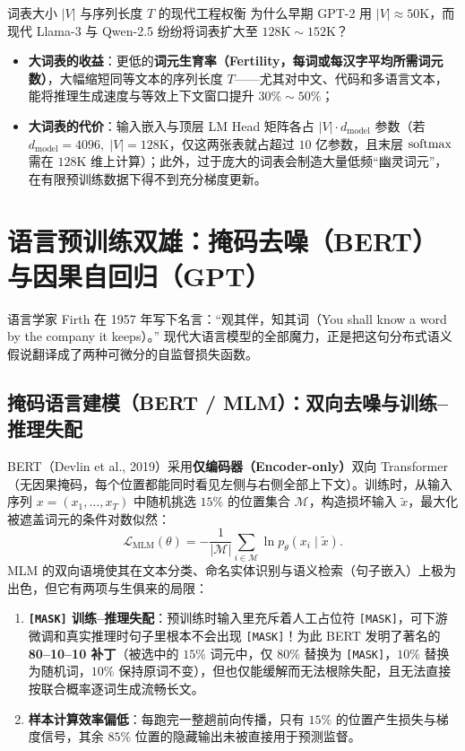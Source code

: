 \begin{insightBox}{词表大小 $|V|$ 与序列长度 $T$ 的现代工程权衡}
为什么早期 GPT-2 用 $|V| \approx 50\text{K}$，而现代 Llama-3 与 Qwen-2.5 纷纷将词表扩大至 $128\text{K} \sim 152\text{K}$？
\begin{itemize}
  \item \textbf{大词表的收益}：更低的\textbf{词元生育率（Fertility，每词或每汉字平均所需词元数）}，大幅缩短同等文本的序列长度 $T$——尤其对中文、代码和多语言文本，能将推理生成速度与等效上下文窗口提升 $30\% \sim 50\%$；
  \item \textbf{大词表的代价}：输入嵌入与顶层 LM Head 矩阵各占 $|V| \cdot d_{\text{model}}$ 参数（若 $d_{\text{model}}=4096,\; |V|=128\text{K}$，仅这两张表就占超过 $10$ 亿参数，且末层 $\operatorname{softmax}$ 需在 $128\text{K}$ 维上计算）；此外，过于庞大的词表会制造大量低频“幽灵词元”，在有限预训练数据下得不到充分梯度更新。
\end{itemize}
\end{insightBox}

\section{语言预训练双雄：掩码去噪（BERT）与因果自回归（GPT）}
\label{sec:mlm-clm}

语言学家 Firth 在 1957 年写下名言：“观其伴，知其词（You shall know a word by the company it keeps）。” 现代大语言模型的全部魔力，正是把这句分布式语义假说翻译成了两种可微分的自监督损失函数。

\subsection{掩码语言建模（BERT / MLM）：双向去噪与训练--推理失配}

BERT（Devlin et al., 2019）采用\textbf{仅编码器（Encoder-only）}双向 Transformer（无因果掩码，每个位置都能同时看见左侧与右侧全部上下文）。训练时，从输入序列 $x = (x_1, \dots, x_T)$ 中随机挑选 $15\%$ 的位置集合 $\mathcal{M}$，构造损坏输入 $\tilde{x}$，最大化被遮盖词元的条件对数似然：
\begin{equation}
  \mathcal{L}_{\mathrm{MLM}}(\theta) = -\frac{1}{|\mathcal{M}|} \sum_{i \in \mathcal{M}} \ln p_\theta\!\left(x_i \mid \tilde{x}\right).
  \label{eq:mlm-loss}
\end{equation}
MLM 的双向语境使其在文本分类、命名实体识别与语义检索（句子嵌入）上极为出色，但它有两项与生俱来的局限：
\begin{enumerate}
  \item \textbf{\texttt{[MASK]} 训练--推理失配}：预训练时输入里充斥着人工占位符 \texttt{[MASK]}，可下游微调和真实推理时句子里根本不会出现 \texttt{[MASK]}！为此 BERT 发明了著名的 \textbf{80--10--10 补丁}（被选中的 $15\%$ 词元中，仅 $80\%$ 替换为 \texttt{[MASK]}，$10\%$ 替换为随机词，$10\%$ 保持原词不变），但也仅能缓解而无法根除失配，且无法直接按联合概率逐词生成流畅长文。
  \item \textbf{样本计算效率偏低}：每跑完一整趟前向传播，只有 $15\%$ 的位置产生损失与梯度信号，其余 $85\%$ 位置的隐藏输出未被直接用于预测监督。
\end{enumerate}

